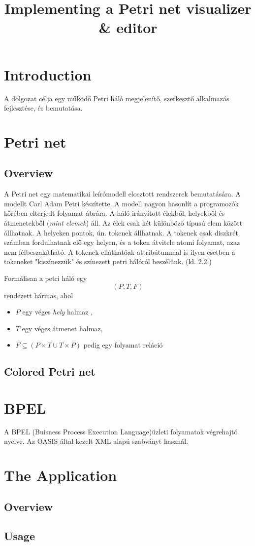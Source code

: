 \documentclass[12pt,a4paper]{article}
\date{\vspace{-5ex}}
\title{Implementing a Petri net visualizer \& editor}%
\begin{document}
\maketitle
\section{Introduction}
A dolgozat célja egy működő Petri háló  megjelenítő, szerkesztő %
alkalmazás fejlesztése, és bemutatása. %
\section{Petri net}
\subsection{Overview}
A Petri net egy matematikai leírómodell elosztott rendszerek bemutatására. A modellt Carl Adam Petri készítette. A modell nagyon hasonlít a programozók körében elterjedt folyamat ábrára. A háló irányított élekből, helyekből és átmenetekből (\textsl{mint elemek}) áll. Az élek csak két különböző típusú elem között állhatnak. A helyeken pontok, ún. tokenek állhatnak. A tokenek csak diszkrét számban fordulhatnak elő egy helyen, és a token átvitele atomi folyamat, azaz nem félbeszakítható. A tokenek elláthatóak attribútummal is ilyen esetben a tokeneket "kiszínezzük" és színezett petri hálóról beszélünk. (ld. 2.2.) %

Formálisan  a petri háló egy $$(P,T,F)$$ rendezett hármas, ahol 
\begin{itemize}
\item $P$ egy véges \textsl{hely} halmaz ,
\item $T$ egy véges átmenet halmaz,
\item $F\subseteq (P\times T\cup T\times P)$ pedig egy folyamat reláció
\end{itemize}

\subsection{Colored Petri net}
\section{BPEL}
A BPEL (Buisness Process Execution Language)üzleti folyamatok végrehajtó nyelve. Az OASIS által kezelt XML alapú szabványt használ. 
\section{The Application}
\subsection{Overview}
\subsection{Usage}
\end{document}
